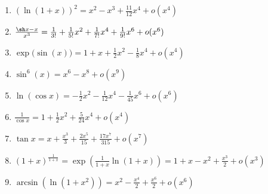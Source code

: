 {\begin{enumerate}
{\begin{enumerate}
  \item $\left( \ln (1+x) \right)^2= x^2-x^3+\frac{11}{12}x^4+ o(x^4)$

  \item $\frac{\sh x-x}{x^3} = \frac{1}{3!}+\frac{1}{5!}x^2+\frac{1}{7!}x^4+\frac{1}{9!}x^6 + o(x^6)$

  \item $\exp\big(\sin(x)\big)=1+x + \frac12 x^2 - \frac18 x^4+ o(x^4)$

  \item $\sin^6 (x)  =  x^6-x^8 + o(x^9)$

  \item $\ln(\cos x) =  - \frac{1}{2} x^2 -\frac{1}{12}x^4 -\frac{1}{45}x^6  + o(x^6)$

  \item $\frac{1}{\cos x} = 1+\frac{1}{2}x^2+\frac{5}{24}x^4 + o(x^4)$

  \item $\tan x = x + \frac{x^3}{3} + \frac{2x^5}{15} + \frac{17x^7}{315} + o(x^7)$

  \item $(1+x)^{\frac{1}{1+x}} =  \exp\left( \frac{1}{1+x} \ln(1+x) \right) = 1+x-x^2 + \frac{x^3}{2} + o(x^3)$

  \item  $\arcsin \left ( \ln(1+x^2) \right ) = x^2-\frac{x^4}{2}+\frac{x^6}{2}+o(x^6)$
\end{enumerate}}
\end{enumerate}
}
